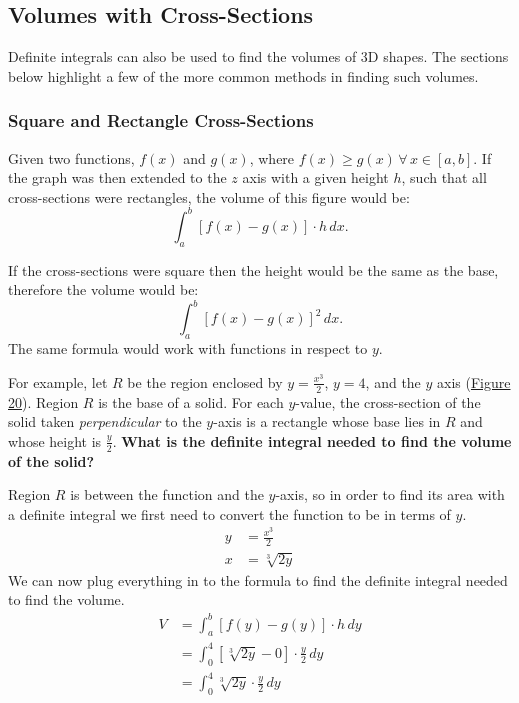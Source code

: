 \documentclass[12pt]{article}
\begin{document}
\subsection{Volumes with Cross-Sections}
Definite integrals can also be used to find the volumes of 3D shapes. The sections below highlight a few of the more common methods in finding such volumes.

\subsubsection{Square and Rectangle Cross-Sections}
Given two functions, $f(x)$ and $g(x)$, where $f(x) \ge g(x) \, \forall \, x \in [a, b]$. If the graph was then extended to the $z$ axis with a given height $h$, such that all cross-sections were rectangles, the volume of this figure would be:
\[ \int_a^b \left[ f(x) - g(x) \right] \cdot h \, dx. \]

If the cross-sections were square then the height would be the same as the base, therefore the volume would be:
\[ \int_a^b \left[ f(x) - g(x) \right]^2 \, dx. \]
The same formula would work with functions in respect to $y$.
\bigskip

For example, let $R$ be the region enclosed by $y=\frac{x^3}{2}$, $y=4$, and the $y$ axis (\hyperref[fig:srcross]{Figure 20}). Region $R$ is the base of a solid. For each $y$-value, the cross-section of the solid taken \textit{perpendicular} to the $y$-axis is a rectangle whose base lies in $R$ and whose height is $\frac{y}{2}$. \textbf{What is the definite integral needed to find the volume of the solid?}

\noindent Region $R$ is between the function and the $y$-axis, so in order to find its area with a definite integral we first need to convert the function to be in terms of $y$.
\begin{align*}
    y & = \frac{x^3}{2} \\[6pt]
    x & = \sqrt[3]{2y}
\end{align*}
We can now plug everything in to the formula to find the definite integral needed to find the volume.
\begin{align*}
    V & = \int_a^b \left[ f(y) - g(y) \right] \cdot h \, dy                \\
      & = \int_0^4 \left[ \sqrt[3]{2y} - 0 \right] \cdot \frac{y}{2} \, dy \\[6pt]
      & = \int_0^4 \sqrt[3]{2y} \cdot \frac{y}{2} \, dy
\end{align*}
\end{document}
